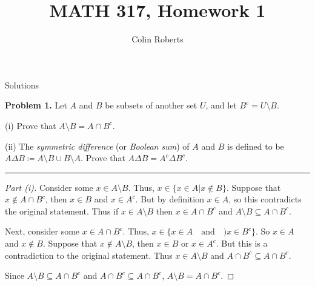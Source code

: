 \documentclass[leqno]{article}
\author{Colin Roberts}
\title{MATH 317, Homework 1}
\theoremstyle{nonumberplain}
\newtheorem{proof}{Proof}
\begin{document}
\maketitle
\begin{large}
\begin{center}
Solutions
\end{center}
\end{large}
\pagebreak

\noindent\textbf{Problem 1.} Let $A$ and $B$ be subsets of another set $U$, and let $B^c = U \setminus B$.  

(i) Prove that $A \setminus B = A \cap B^c$.

(ii) The \emph{symmetric difference} (or \emph{Boolean sum}) of $A$ and $B$ is defined to be $A\Delta B \coloneqq A\setminus B \cup B \setminus A$.  Prove that $A \Delta B = A^c \Delta B^c$.

\noindent\rule[0.5ex]{\linewidth}{1pt}

\begin{proof}[Part (i)]
Consider some $x \in A \setminus B$.  Thus, $x \in \{x \in A | x \notin B \}$.  Suppose that $x \notin A \cap B^c$, then $x \in B$ and $x\in A^c$.  But by definition $x \in A$, so this contradicts the original statement.  Thus if $x \in A \setminus B$ then $x \in A \cap B^c$ and $A \setminus B \subseteq A \cap B^c$. 
 
Next, consider some $x \in A \cap B^c$.  Thus, $x \in \{x \in A \textrm{~~ and ~~)} x \in B^c\}$.  So $x\in A$ and $x\notin B$. Suppose that $x \notin A\setminus B$, then $x \in B$ or $x \in A^c$.  But this is a contradiction to the original statement.  Thus $x\in A \setminus B$ and $A \cap B^c \subseteq A \cap B^c$.  

Since $A \setminus B \subseteq A \cap B^c$ and $A \cap B^c \subseteq A \cap B^c$, $A \setminus B = A \cap B^c$.
\end{proof}
\end{document}
